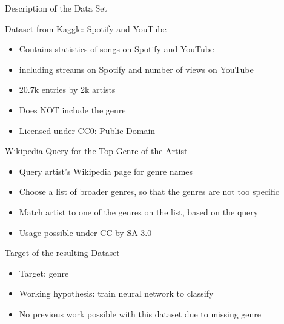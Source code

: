 \documentclass[8pt]{beamer}
\begin{document}
\begin{frame}{Description of the Data Set}
  \begin{alertblock}{Dataset from \href{https://www.kaggle.com/datasets/salvatorerastelli/spotify-and-youtube}{Kaggle}: Spotify and YouTube}
	\begin{itemize}
      \item Contains statistics of songs on Spotify and YouTube 
      \item including streams on Spotify and number of views on YouTube
      \item 20.7k entries by 2k artists
      \item Does \alert{NOT} include the genre
      \item Licensed under CC0: Public Domain
    \end{itemize}
  \end{alertblock}
  \begin{alertblock}{Wikipedia Query for the Top-Genre of the Artist}
	\begin{itemize}
     \item Query artist's Wikipedia page for genre names
     \item Choose a list of broader genres, so that the genres are not too specific
     \item Match artist to one of the genres on the list, based on the query
     \item Usage possible under CC-by-SA-3.0
    \end{itemize}
  \end{alertblock}
  \begin{alertblock}{Target of the resulting Dataset}
	\begin{itemize}
     \item Target: genre
     \item Working hypothesis: train neural network to classify
     \item No previous work possible with this dataset due to missing genre
    \end{itemize}
  \end{alertblock}
\end{frame}
\end{document}
